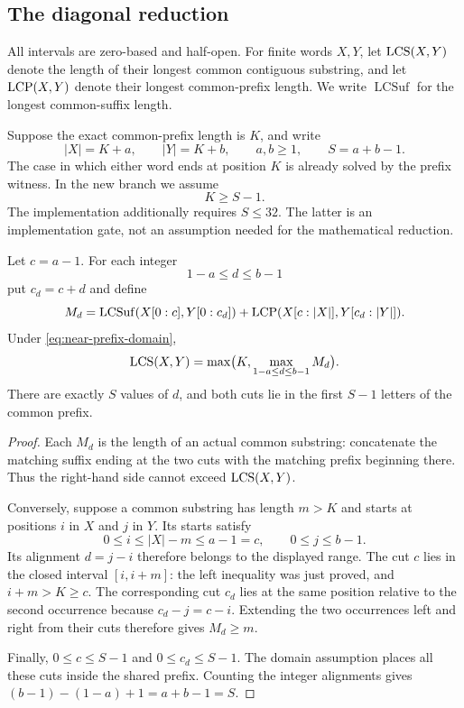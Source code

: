 \subsection{The diagonal reduction}

All intervals are zero-based and half-open. For finite words $X,Y$, let
$\operatorname{LCS}(X,Y)$ denote the length of their longest common contiguous substring,
and let $\operatorname{LCP}(X,Y)$ denote their longest common-prefix length. We write
$\operatorname{LCSuf}$ for the longest common-suffix length.

Suppose the exact common-prefix length is $K$, and write
\[
 |X|=K+a,\qquad |Y|=K+b,\qquad
 a,b\ge1,\qquad S=a+b-1.
\]
The case in which either word ends at position $K$ is already solved by
the prefix witness. In the new branch we assume
\begin{equation}
 K\ge S-1.
 \label{eq:near-prefix-domain}
\end{equation}
The implementation additionally requires $S\le32$. The latter is an
implementation gate, not an assumption needed for the mathematical reduction.

\begin{lemma}
\label{lem:near-prefix-diagonals}
Let $c=a-1$. For each integer
\[
 1-a\le d\le b-1
\]
put $c_d=c+d$ and define
\[
 M_d=
 \operatorname{LCSuf}(X[0:c],Y[0:c_d])
 +\operatorname{LCP}(X[c:|X|],Y[c_d:|Y|]).
\]
Under \eqref{eq:near-prefix-domain},
\begin{equation}
 \operatorname{LCS}(X,Y)=\max\bigl(K,\max_{1-a\le d\le b-1}M_d\bigr).
 \label{eq:near-prefix-max}
\end{equation}
There are exactly $S$ values of $d$, and both cuts lie in the first
$S-1$ letters of the common prefix.
\end{lemma}

\begin{proof}
Each $M_d$ is the length of an actual common substring: concatenate the
matching suffix ending at the two cuts with the matching prefix beginning
there. Thus the right-hand side cannot exceed $\operatorname{LCS}(X,Y)$.

Conversely, suppose a common substring has length $m>K$ and starts at
positions $i$ in $X$ and $j$ in $Y$. Its starts satisfy
\[
 0\le i\le |X|-m\le a-1=c,
 \qquad 0\le j\le b-1.
\]
Its alignment $d=j-i$ therefore belongs to the displayed range. The cut
$c$ lies in the closed interval $[i,i+m]$: the left inequality was just
proved, and $i+m>K\ge c$. The corresponding cut $c_d$ lies at the same
position relative to the second occurrence because
$c_d-j=c-i$. Extending the two occurrences left and right from their cuts
therefore gives $M_d\ge m$.

Finally, $0\le c\le S-1$ and $0\le c_d\le S-1$. The domain assumption
places all these cuts inside the shared prefix. Counting the integer
alignments gives $(b-1)-(1-a)+1=a+b-1=S$.
\end{proof}

